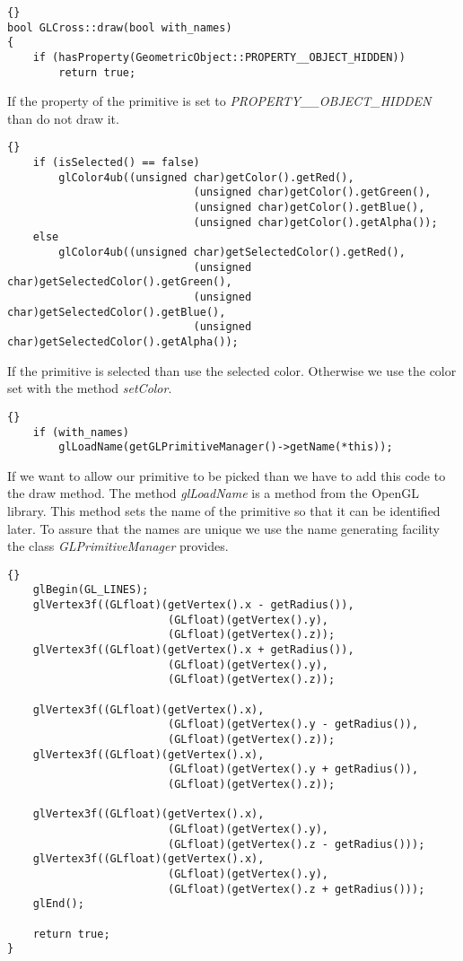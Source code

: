 \begin{lstlisting}{}
bool GLCross::draw(bool with_names)
{
	if (hasProperty(GeometricObject::PROPERTY__OBJECT_HIDDEN))
		return true;
\end{lstlisting}

If the property of the primitive is set to {\em PROPERTY\_\_OBJECT\_HIDDEN} than
do not draw it. 

\begin{lstlisting}{}
	if (isSelected() == false)
		glColor4ub((unsigned char)getColor().getRed(),
							 (unsigned char)getColor().getGreen(),
							 (unsigned char)getColor().getBlue(),
							 (unsigned char)getColor().getAlpha());
	else
		glColor4ub((unsigned char)getSelectedColor().getRed(),
							 (unsigned char)getSelectedColor().getGreen(),
							 (unsigned char)getSelectedColor().getBlue(),
							 (unsigned char)getSelectedColor().getAlpha());
\end{lstlisting}

If the primitive is selected than use the selected color. Otherwise
we use the color set with the method {\em setColor}.

\begin{lstlisting}{}
	if (with_names)
		glLoadName(getGLPrimitiveManager()->getName(*this));
\end{lstlisting}

If we want to allow our primitive to be picked than we have to add this code
to the draw method. The method {\em glLoadName} is a method from the OpenGL
library. This method sets the name of the primitive so that it can be identified
later. To assure that the names are unique we use the name generating facility the class
{\em GLPrimitiveManager} provides.

\begin{lstlisting}{}
	glBegin(GL_LINES);
	glVertex3f((GLfloat)(getVertex().x - getRadius()),
						 (GLfloat)(getVertex().y),
						 (GLfloat)(getVertex().z));
	glVertex3f((GLfloat)(getVertex().x + getRadius()),
						 (GLfloat)(getVertex().y),
						 (GLfloat)(getVertex().z));

	glVertex3f((GLfloat)(getVertex().x),
						 (GLfloat)(getVertex().y - getRadius()),
						 (GLfloat)(getVertex().z));
	glVertex3f((GLfloat)(getVertex().x),
						 (GLfloat)(getVertex().y + getRadius()),
						 (GLfloat)(getVertex().z));

	glVertex3f((GLfloat)(getVertex().x),
						 (GLfloat)(getVertex().y),
						 (GLfloat)(getVertex().z - getRadius()));
	glVertex3f((GLfloat)(getVertex().x),
						 (GLfloat)(getVertex().y),
						 (GLfloat)(getVertex().z + getRadius()));
	glEnd();

	return true;
}
\end{lstlisting}

